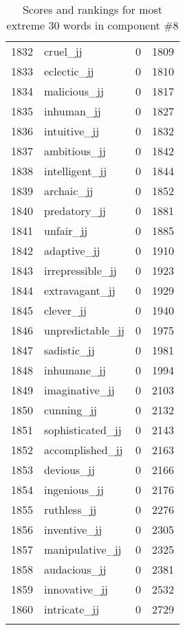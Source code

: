 \begin{longtable}[!htbp]{| rlr@{.}l |}
    1832 & cruel\_jj & 0 & 1809 \\
    1833 & eclectic\_jj & 0 & 1810 \\
    1834 & malicious\_jj & 0 & 1817 \\
    1835 & inhuman\_jj & 0 & 1827 \\
    1836 & intuitive\_jj & 0 & 1832 \\
    1837 & ambitious\_jj & 0 & 1842 \\
    1838 & intelligent\_jj & 0 & 1844 \\
    1839 & archaic\_jj & 0 & 1852 \\
    1840 & predatory\_jj & 0 & 1881 \\
    1841 & unfair\_jj & 0 & 1885 \\
    1842 & adaptive\_jj & 0 & 1910 \\
    1843 & irrepressible\_jj & 0 & 1923 \\
    1844 & extravagant\_jj & 0 & 1929 \\
    1845 & clever\_jj & 0 & 1940 \\
    1846 & unpredictable\_jj & 0 & 1975 \\
    1847 & sadistic\_jj & 0 & 1981 \\
    1848 & inhumane\_jj & 0 & 1994 \\
    1849 & imaginative\_jj & 0 & 2103 \\
    1850 & cunning\_jj & 0 & 2132 \\
    1851 & sophisticated\_jj & 0 & 2143 \\
    1852 & accomplished\_jj & 0 & 2163 \\
    1853 & devious\_jj & 0 & 2166 \\
    1854 & ingenious\_jj & 0 & 2176 \\
    1855 & ruthless\_jj & 0 & 2276 \\
    1856 & inventive\_jj & 0 & 2305 \\
    1857 & manipulative\_jj & 0 & 2325 \\
    1858 & audacious\_jj & 0 & 2381 \\
    1859 & innovative\_jj & 0 & 2532 \\
    1860 & intricate\_jj & 0 & 2729 \\
    \hline
    \caption{Scores and rankings for most extreme 30 words in component \#8} \\
\end{longtable}
